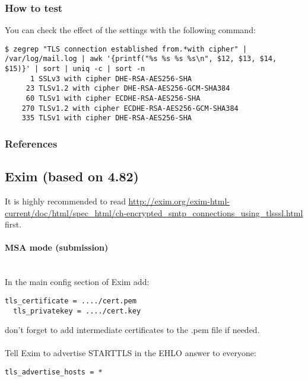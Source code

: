 

\subsubsection{How to test}

You can check the effect of the settings with the following command:
\begin{lstlisting}[breaklines]
$ zegrep "TLS connection established from.*with cipher" | /var/log/mail.log | awk '{printf("%s %s %s %s\n", $12, $13, $14, $15)}' | sort | uniq -c | sort -n
      1 SSLv3 with cipher DHE-RSA-AES256-SHA
     23 TLSv1.2 with cipher DHE-RSA-AES256-GCM-SHA384
     60 TLSv1 with cipher ECDHE-RSA-AES256-SHA
    270 TLSv1.2 with cipher ECDHE-RSA-AES256-GCM-SHA384
    335 TLSv1 with cipher DHE-RSA-AES256-SHA
\end{lstlisting}

\subsubsection{References} 


\subsection{Exim (based on 4.82)}

It is highly recommended to read
\url{http://exim.org/exim-html-current/doc/html/spec_html/ch-encrypted_smtp_connections_using_tlsssl.html}
first.

\paragraph*{MSA mode (submission)}\mbox{}\\

In the main config section of Exim add:

\begin{lstlisting}[breaklines]
  tls_certificate = ..../cert.pem
  tls_privatekey = ..../cert.key
\end{lstlisting}
don't forget to add intermediate certificates to the .pem file if needed.\\
\\
Tell Exim to advertise STARTTLS in the EHLO answer to everyone:
\begin{lstlisting}[breaklines]
  tls_advertise_hosts = *
\end{lstlisting}


